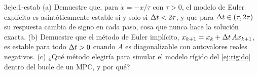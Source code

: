 \begin{ejercicio}{3}{eje:1-estab}
(a) Demuestre que, para $\dot x=-x/\tau$ con $\tau>0$, el modelo de Euler explícito es asintóticamente estable si y solo si $\Delta t<2\tau$, y que para $\Delta t\in(\tau,2\tau)$ su respuesta cambia de signo en cada paso, cosa que nunca hace la solución exacta. (b) Demuestre que el método de Euler implícito, $x_{k+1}=x_k+\Delta t\,Ax_{k+1}$, es estable para todo $\Delta t>0$ cuando $A$ es diagonalizable con autovalores reales negativos. (c) ¿Qué método elegiría para simular el modelo rígido del \cref{ej:rigido} dentro del bucle de un MPC, y por qué?
\end{ejercicio}
